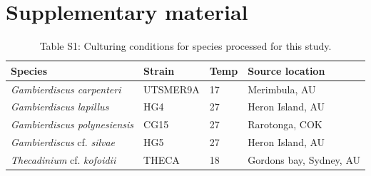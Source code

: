\documentclass[12pt]{article}
\begin{document}
\section{Supplementary material}
\FloatBarrier
\begin{table}
\caption{Table S1: Culturing conditions for species processed for this study.}
\begin{tabular}{ | p{3cm} | p{2.5cm} | p{1.5cm} | p{5.3cm} |}
\hline
\textbf{Species} & \textbf{Strain}& \textbf{Temp} & \textbf{Source location} \\
\hline
\textit{Gambierdiscus carpenteri}&UTSMER9A&17&Merimbula, AU\\
\hline
\textit{Gambierdiscus lapillus}&HG4&27&Heron Island, AU\\
\hline
\textit{Gambierdiscus polynesiensis}&CG15&27&Rarotonga, COK\\
\hline
\textit{Gambierdiscus} cf. \textit{silvae}&HG5&27&Heron Island, AU\\
\hline
\textit{Thecadinium} cf. \emph{kofoidii}&THECA&18&Gordons bay, Sydney, AU\\
\hline
\end{tabular}
\end{table}
\FloatBarrier
\end{document}

